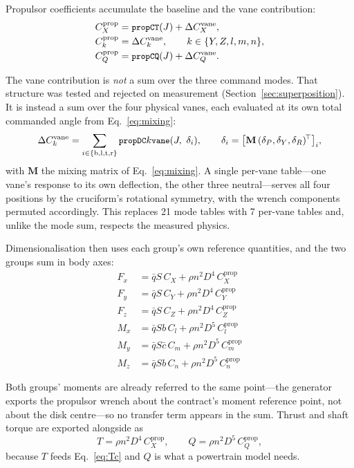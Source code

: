 \documentclass[11pt,a4paper]{article}
\newcommand{\varid}[1]{\texttt{\small #1}}
\begin{document}
Propulsor coefficients accumulate the baseline and the vane
contribution:
\begin{align}
C_X^{\mathrm{prop}} &= \varid{propCT}(J) + \Delta C_X^{\mathrm{vane}},
  \label{eq:propsumfirst}\\
C_k^{\mathrm{prop}} &= \Delta C_k^{\mathrm{vane}},
  \qquad k \in \{Y, Z, l, m, n\}, \\
C_Q^{\mathrm{prop}} &= \varid{propCQ}(J) + \Delta C_Q^{\mathrm{vane}}.
  \label{eq:propsumlast}
\end{align}

The vane contribution is \emph{not} a sum over the three command modes.
That structure was tested and rejected on measurement
(Section~\ref{sec:superposition}). It is instead a sum over the four
physical vanes, each evaluated at its own total commanded angle from
Eq.~\eqref{eq:mixing}:
\begin{equation}
\Delta C_k^{\mathrm{vane}} = \sum_{i \in \{\mathrm{b,l,t,r}\}}
  \varid{propDC}k\varid{vane}(J,\ \delta_i), \qquad
\delta_i = \bigl[\mathbf{M}\,(\delta_P, \delta_Y, \delta_R)^{\!\top}\bigr]_i ,
\label{eq:pervane}
\end{equation}
with $\mathbf{M}$ the mixing matrix of Eq.~\eqref{eq:mixing}. A single
per-vane table---one vane's response to its own deflection, the other
three neutral---serves all four positions by the cruciform's rotational
symmetry, with the wrench components permuted accordingly. This replaces
21 mode tables with 7 per-vane tables and, unlike the mode sum, respects
the measured physics.

Dimensionalisation then uses each group's own reference quantities, and
the two groups sum in body axes:
\begin{align}
F_x &= \bar q S\, C_X + \rho n^2 D^4\, C_X^{\mathrm{prop}} \\
F_y &= \bar q S\, C_Y + \rho n^2 D^4\, C_Y^{\mathrm{prop}} \\
F_z &= \bar q S\, C_Z + \rho n^2 D^4\, C_Z^{\mathrm{prop}} \\
M_x &= \bar q S b\, C_l + \rho n^2 D^5\, C_l^{\mathrm{prop}} \\
M_y &= \bar q S \bar c\, C_m + \rho n^2 D^5\, C_m^{\mathrm{prop}} \\
M_z &= \bar q S b\, C_n + \rho n^2 D^5\, C_n^{\mathrm{prop}}
\end{align}

Both groups' moments are already referred to the same point---the
generator exports the propulsor wrench about the contract's moment
reference point, not about the disk centre---so no transfer term appears
in the sum. Thrust and shaft torque are exported alongside as
\begin{equation}
T = \rho n^2 D^4\, C_X^{\mathrm{prop}}, \qquad
Q = \rho n^2 D^5\, C_Q^{\mathrm{prop}},
\end{equation}
because $T$ feeds Eq.~\eqref{eq:Tc} and $Q$ is what a powertrain model
needs.
\end{document}
